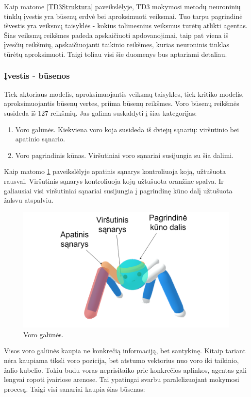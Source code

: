 \documentclass[a4paper, 12pt]{article}
\begin{document}
Kaip matome \ref{TD3Struktura} paveikslėlyje, TD3 mokymosi metodų neuroninių tinklų įvestis yra būsenų erdvė bei aproksimuoti veiksmai. Tuo tarpu pagrindinė išvestis yra veiksmų taisyklės - kokius tolimesnius veiksmus turėtų atlikti agentas. Šias veiksmų reikšmes padeda apskaičiuoti apdovanojimai, taip pat viena iš įvesčių reikšmių, apskaičiuojanti taikinio reikšmes, kurias neuroninis tinklas tūrėtų aproksimuoti. Taigi toliau visi šie duomenys bus aptariami detaliau.

\subsubsection{Įvestis - būsenos}

Tiek aktoriaus modelis, aproksimuojantis veiksmų taisykles, tiek kritiko modelis, aproksimuojantis būsenų vertes, priima būsenų reikšmes. Voro būsenų reikšmės susideda iš 127 reikšmių. Jas galima suskaldyti į šias kategorijas:

\begin{enumerate}
  \addtolength{\itemsep}{-0.5\baselineskip} 
  \item Voro galūnės. Kiekviena voro koja susideda iš dviejų sąnarių: viršutinio bei apatinio sąnario.
  \item Voro pagrindinis kūnas. Viršutiniai voro sąnariai susijungia su šia dalimi.
\end{enumerate}

Kaip matomo \ref{VoroGalunes} paveikslėlyje apatinis sąnarys kontroliuoja koją, užtušuota rausvai. Viršutinis sąnarys kontroliuoja koją užtušuota oranžine spalva. Ir galiausiai visi viršutiniai sąnariai susijungia į pagrindinę kūno dalį užtušuota žalsvu atspalviu.

\begin{figure}[h!]
\centering
\includegraphics[width=.7\textwidth]{VoroGalunes}
\caption{Voro galūnės.}
\label{VoroGalunes}
\end{figure}

Visos voro galūnės kaupia ne konkrečią informaciją, bet santykinę. Kitaip tariant nėra kaupiama tiksli voro pozicija, bet atstumo vektorius nuo voro iki taikinio, žalio kubelio. Tokiu budu voras neprisitaiko prie konkrečios aplinkos, agentas gali lengvai ropoti įvairiose arenose. Tai ypatingai svarbu paralelizuojant mokymosi procesą. Taigi visi sanariai kaupia šias būsenas:
\end{document}
